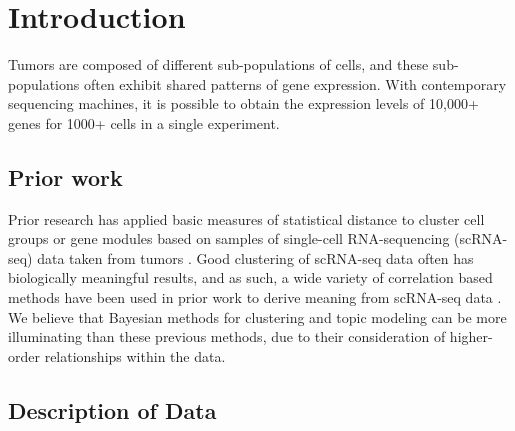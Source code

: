 \documentclass{article}
\begin{document}
 


\section{Introduction}
\label{intro}
Tumors are composed of different sub-populations of cells, and these sub-populations often exhibit shared patterns of gene expression. With contemporary sequencing machines, it is possible to obtain the expression levels of 10,000+ genes for 1000+ cells in a single experiment. 

\subsection{Prior work}
Prior research has applied basic measures of statistical distance to cluster cell groups or gene modules based on samples of single-cell RNA-sequencing (scRNA-seq) data taken from tumors \cite{nature}.  Good clustering of scRNA-seq data often has biologically meaningful results, and as such, a wide variety of correlation based methods have been used in prior work to derive meaning from scRNA-seq data \cite{coexpression, consensus, profiling}. We believe that Bayesian methods for clustering and topic modeling can be more illuminating than these previous methods, due to their consideration of higher-order relationships within the data. \\

\subsection{Description of Data}
\end{document}
